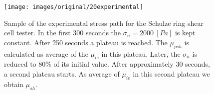 \begin{figure}[!htb] 
\centering 
\texttt{[image: images/original/20experimental]} 
\caption[Experimental stress path]{Sample of the experimental stress path for
the Schulze ring shear cell tester.
In the first 300 seconds the $\sigma_n = 2000 ~[Pa]$ is kept constant. After 250
seconds a plateau is reached.
The $\mu_{psh}$ is calculated as average of the $\mu_{ie}$ in this plateau.
Later, the $\sigma_n$ is reduced to $80 \%$ of its initial value.
After approximately 30 seconds, a second plateau starts.
As average of $\mu_{ie}$ in this second plateau we obtain $\mu_{sh}$.
}
\label{fig:20experimental}
\end{figure}

